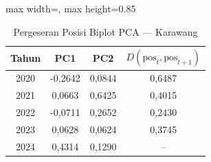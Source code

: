 \begin{table}[H]
\centering
\caption{Pergeseran Posisi Biplot PCA --- Karawang} \label{tab:appjarak_pca_skor_karawang}
\begin{adjustbox}{max width=\textwidth, max height=0.85\textheight}
\begin{tabular}{|c|c|c|c|}
\hline
\textbf{Tahun} & \textbf{PC1} & \textbf{PC2} & \textbf{$D(\text{pos}_t, \text{pos}_{t+1})$} \\
\hline
2020 & -0,2642 & 0,0844 & 0,6487 \\
2021 & 0,0663 & 0,6425 & 0,4015 \\
2022 & -0,0711 & 0,2652 & 0,2430 \\
2023 & 0,0628 & 0,0624 & 0,3745 \\
2024 & 0,4314 & 0,1290 & -- \\
\hline
\end{tabular}
\end{adjustbox}
\end{table}
